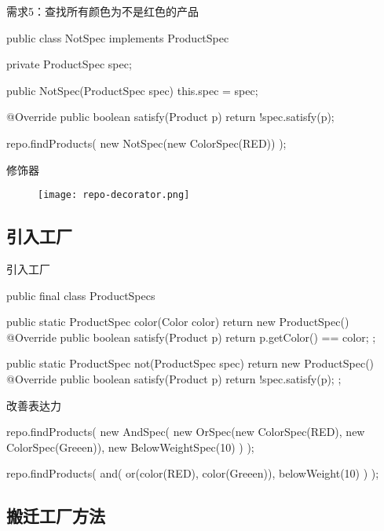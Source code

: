 \begin{frame}[fragile]{需求5：查找所有颜色为不是红色的产品}
  \begin{java}
public class NotSpec implements ProductSpec {
  private ProductSpec spec;

  public NotSpec(ProductSpec spec) {
    this.spec = spec;
  }

  @Override
  public boolean satisfy(Product p) {
    return !spec.satisfy(p);
  }
}

repo.findProducts(
  new NotSpec(new ColorSpec(RED))
);
  \end{java}
\end{frame}

\begin{frame}[fragile]{修饰器}
  \begin{figure}
    \centering
    \texttt{[image: repo-decorator.png]}
  \end{figure}
\end{frame}

\subsection{引入工厂}

\begin{frame}[fragile]{引入工厂}
  \begin{java}
public final class ProductSpecs {
  public static ProductSpec color(Color color) {
    return new ProductSpec() {
      @Override
      public boolean satisfy(Product p) {
        return p.getColor() == color;
      }
    };
  }

  public static ProductSpec not(ProductSpec spec) {
    return new ProductSpec() {
      @Override
      public boolean satisfy(Product p) {
        return !spec.satisfy(p);
      }
    };
  }
}
  \end{java}
\end{frame}

\begin{frame}[fragile]{改善表达力}
  \begin{java}
repo.findProducts(
  new AndSpec(
    new OrSpec(new ColorSpec(RED), new ColorSpec(Greeen)), 
    new BelowWeightSpec(10)
  )
);

repo.findProducts(
  and(
    or(color(RED), color(Greeen)), 
    belowWeight(10)
  )
);
  \end{java}
\end{frame}

\subsection{搬迁工厂方法}

